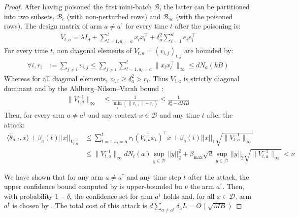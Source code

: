 \begin{proof}
After having poisoned the first mini-batch $\mathcal{B}$, the latter can be partitioned into two subsets, $\mathcal{B}_{c}$ (with non-perturbed rows) and $\mathcal{B}_{nc}$ (with the poisoned rows). The design matrix of arm $a\neq a^{\dagger}$ for every time $t$ after the poisoning is:
\begin{align}
    V_{t,a} = \lambda I_d +  \sum_{l=1, a_{l} = a}^{t} x_{l}x_{l}^{\intercal} + \delta_{a}^2 \sum_{i=1}^{d} e_i e_i^{\intercal}
\end{align}
For every time $t$, non diagonal elements of $V_{t,a} = (v_{i,j})_{i,j}$ are bounded by: 
\begin{align}\label{non_diagonal_element}
    \forall i, r_i &:= \sum_{j \neq i} v_{i,j}\leq \sum_{j \neq i} \sum_{l=1, a_{l} = a}^{t} \lVert x_l x_{l}^{\intercal}\rVert_\infty\leq dN_{a}(kB)
\end{align}
Whereas for all diagonal elements, $v_{i,i} \geq \delta_{a}^2 > r_i$. Thus $V_{t,a}$ is strictly diagonal dominant and by the Ahlberg–Nilson–Varah bound \cite{varah1975lower}:
\begin{align}\label{eq:bound_norm_design_matrix}
\lVert V_{t,a}^{-1} \rVert_\infty &\leq \frac{1}{\min_{i} \left(\lVert v_{i,i}\rVert - r_i\right)} \leq \frac{1}{\delta_{a}^{2} - dMB}
\end{align}
Then, for every arm $a \neq a^{\dagger}$ and any context $x\in \mathcal{D}$ and any time $t$ after the attack:
\begin{align*}
    \langle\hat{\theta}_{a,t}, x\rangle + \beta_{a}(t) ||x||_{V_{t,a}^{-1}} & \leq  \sum_{l=1, a_{l} = a}^{t} r_t (V_{t,a}^{-1} x_t)^{\intercal} x + \beta_{a}(t)||x||_{1}\sqrt{\lVert V_{t,a}^{-1} \rVert_\infty}\\
    & \leq  \lVert V_{t,a}^{-1} \rVert_\infty dN_{t}(a) \sup_{y\in\mathcal{D}} ||y||_{2}^{2} + \beta_{\text{max}}\sqrt{d}\sup_{y\in\mathcal{D}} ||y||_{2}\sqrt{\lVert V_{t,a}^{-1} \rVert_\infty} < \nu
\end{align*}

    
We have shown that for any arm $a \neq a^{\dagger}$ and any time step $t$ after the attack, the upper confidence bound computed by \linucb is upper-bounded bu $\nu$ the arm $a^{\dagger}$. Then, with probability $1-\delta$, the confidence set for arm $a^{\dagger}$ holds and, for all $x \in \mathcal{D}$, arm $a^{\dagger}$ is chosen by \linucb. The total cost of this attack is $d \sum_{a\neq a^{\dagger}} \delta_{a} L = O(\sqrt{MB})$
\end{proof}



